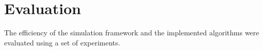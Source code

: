 \documentclass[../report.tex]{subfiles}
\begin{document}
    \section{Evaluation}
    \label{sec:evaluation}

    The efficiency of the simulation framework and the implemented algorithms were evaluated using a set of experiments. 
\end{document}
